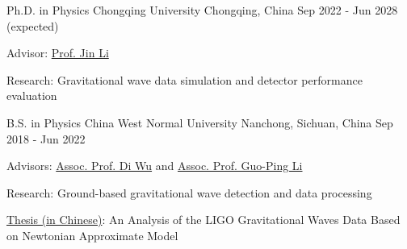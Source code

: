 

\begin{cventries}

  \cventry
    {Ph.D. in Physics} %
    {Chongqing University} %
    {Chongqing, China}%
    {Sep 2022 - Jun 2028 (expected)} %
    {
      \begin{cvitems} %
        \item{Advisor: \href{https://inspirehep.net/authors/1456898?ui-citation-summary=true&ui-exclude-self-citations=true}{Prof. Jin Li}}
        \item{Research: Gravitational wave data simulation and detector performance evaluation}
      \end{cvitems}
    }

  \cventry
    {B.S. in Physics} %
    {China West Normal University} %
    {Nanchong, Sichuan, China}%
    {Sep 2018 - Jun 2022} %
    {
      \begin{cvitems} %
        \item{Advisors: \href{https://inspirehep.net/authors/1647692?ui-citation-summary=true&ui-exclude-self-citations=true}{Assoc. Prof. Di Wu} and \href{https://inspirehep.net/authors/1275221?ui-citation-summary=true&ui-exclude-self-citations=true}{Assoc. Prof. Guo-Ping Li}}
        \item{Research: Ground-based gravitational wave detection and data processing}
        \item{\href{https://wujie3375.github.io/file/Undergraduate-Thesis.pdf}{Thesis (in Chinese)}: An Analysis of the LIGO Gravitational Waves Data Based on Newtonian Approximate Model}
      \end{cvitems}
    }

\end{cventries}
